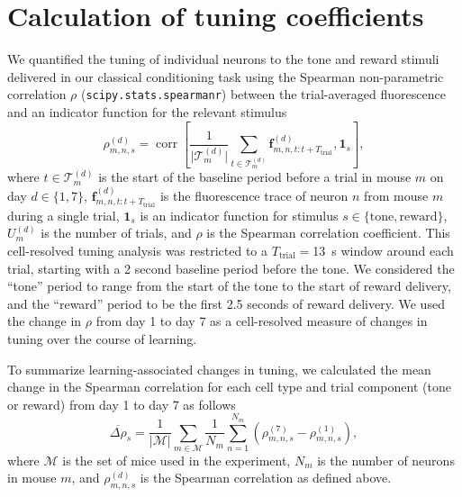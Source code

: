 \documentclass{article}
\DeclareMathOperator{\corr}{corr}
\begin{document}
\section{Calculation of tuning coefficients}

We quantified the tuning of individual neurons to the tone and reward stimuli
delivered in our classical conditioning task using the Spearman non-parametric
correlation $\rho$ (\texttt{scipy.stats.spearmanr}) between the trial-averaged
fluorescence and an indicator function for the relevant stimulus
\begin{equation}
    \rho_{m,n,s}^{(d)} =
    \corr\left[\frac{1}{\lvert \mathcal{T}_{m}^{(d)} \rvert}\sum_{t \in \mathcal{T}_{m}^{(d)}}\mathbf{f}_{m,n,t:t+T_\text{trial}}^{(d)},
    \mathbf{1}_s\right],
\end{equation}
where $t \in \mathcal{T}_{m}^{(d)}$ is the start of the baseline period before a
trial in mouse $m$ on day $d \in \{1, 7\}$,
$\mathbf{f}_{m,n,t:t+T_\text{trial}}^{(d)}$ is the fluorescence trace of neuron
$n$ from mouse $m$ during a single trial, $\mathbf{1}_s$ is an indicator
function for stimulus $s \in \{\text{tone}, \text{reward}\}$, $U_m^{(d)}$ is the
number of trials, and $\rho$ is the Spearman correlation coefficient.  This
cell-resolved tuning analysis was restricted to a $T_\text{trial} = $\SI{13}{\s}
window around each trial, starting with a 2 second baseline period before the
tone. We considered the ``tone'' period to range from the start of the tone to
the start of reward delivery, and the ``reward'' period to be the first 2.5
seconds of reward delivery. We used the change in $\rho$ from day 1 to day 7 as
a cell-resolved measure of changes in tuning over the course of learning.

To summarize learning-associated changes in tuning, we calculated the mean
change in the Spearman correlation for each cell type and trial component (tone
or reward) from day 1 to day 7 as follows
\begin{equation}
    \overline{\Delta\rho}_{s} = \frac{1}{\lvert \mathcal{M} \rvert} \sum_{m \in \mathcal{M}} \frac{1}{N_m} \sum_{n=1}^{N_m}
    \left(\rho_{m,n,s}^{(7)} - \rho_{m,n,s}^{(1)}\right),
\end{equation}
where $\mathcal{M}$ is the set of mice used in the experiment, $N_m$ is the
number of neurons in mouse $m$, and $\rho_{m,n,s}^{(d)}$ is the Spearman
correlation as defined above.
\end{document}
